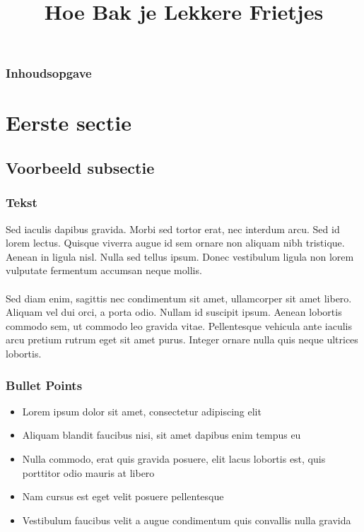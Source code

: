 \documentclass[aspectratio=169]{uva-inf-presentation}
\title{Hoe Bak je Lekkere Frietjes}
\begin{document}
\begin{titelframe}
\titlepage
\end{titelframe}

\begin{frame}
\frametitle{Inhoudsopgave}
\tableofcontents
\end{frame}


\section{Eerste sectie}
\subsection{Voorbeeld subsectie}

\begin{frame}
\frametitle{Tekst}
Sed iaculis dapibus gravida. Morbi sed tortor erat, nec interdum arcu. Sed id
lorem lectus. Quisque viverra augue id sem ornare non aliquam nibh tristique.
Aenean in ligula nisl. Nulla sed tellus ipsum. Donec vestibulum ligula non lorem
vulputate fermentum accumsan neque mollis.\\~\\

Sed diam enim, sagittis nec condimentum sit amet, ullamcorper sit amet libero.
Aliquam vel dui orci, a porta odio. Nullam id suscipit ipsum. Aenean lobortis
commodo sem, ut commodo leo gravida vitae. Pellentesque vehicula ante iaculis
arcu pretium rutrum eget sit amet purus. Integer ornare nulla quis neque
ultrices lobortis.
\end{frame}


\begin{frame}
\frametitle{Bullet Points}
\begin{itemize}
\item Lorem ipsum dolor sit amet, consectetur adipiscing elit
\item Aliquam blandit faucibus nisi, sit amet dapibus enim tempus eu
\item Nulla commodo, erat quis gravida posuere, elit lacus lobortis est, quis
      porttitor odio mauris at libero
\item Nam cursus est eget velit posuere pellentesque
\item Vestibulum faucibus velit a augue condimentum quis convallis nulla gravida
\end{itemize}
\end{frame}
\end{document}
